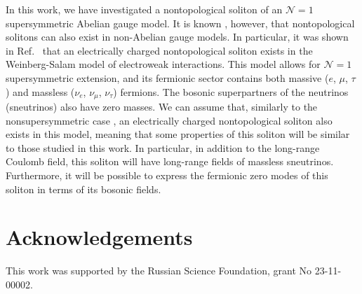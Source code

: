 In this work, we have investigated  a nontopological soliton of an $\mathcal{N}
= 1$ supersymmetric Abelian gauge model.
It is  known \cite{fried1, fried2},  however,  that nontopological solitons can
also exist in non-Abelian gauge models.
In particular, it was shown in  Ref.~\cite{lgn_jetp_2012}  that an electrically
charged nontopological   soliton   exists   in   the   Weinberg-Salam  model of
electroweak interactions.
This model  allows  for  $\mathcal{N} = 1$  supersymmetric  extension,  and its
fermionic sector  contains  both  massive ($e$,  $\mu$,  $\tau$)  and  massless
($\nu_{e}$, $\nu_{\mu}$, $\nu_{\tau}$) fermions.
The bosonic superpartners of the  neutrinos (sneutrinos) also have zero masses.
We   can   assume     that,    similarly    to    the    nonsupersymmetric case
\cite{lgn_jetp_2012},  an  electrically   charged  nontopological  soliton also
exists in this model, meaning  that  some  properties  of  this soliton will be
similar to those studied in this work.
In particular, in addition  to  the long-range Coulomb field, this soliton will 
have long-range fields of massless sneutrinos.
Furthermore, it will be  possible  to  express the fermionic zero modes of this
soliton in terms of its bosonic fields.

\section*{Acknowledgements}

This work was supported by the Russian Science Foundation, grant No 23-11-00002.










